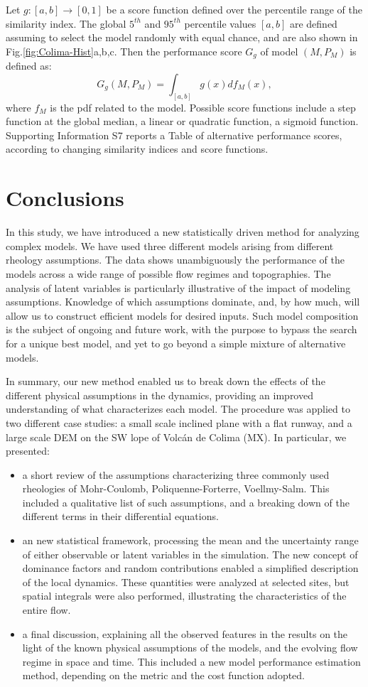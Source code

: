 \documentclass{article}
\begin{document}
Let $g:[a,b]\rightarrow[0,1]$ be a score function defined over the percentile range of the similarity index. The global $5^{th}$ and $95^{th}$ percentile values $[a,b]$ are defined assuming to select the model randomly with equal chance, and are also shown in Fig.\ref{fig:Colima-Hist}a,b,c. Then the performance score $G_g$ of model $\left(M, P_M\right)$ is defined as:
$$G_g\left(M, P_M\right)=\int_{[a,b]} g(x) df_M(x),$$
where $f_M$ is the pdf related to the model. Possible score functions include a step function at the global median, a linear or quadratic function, a sigmoid function. Supporting Information S7 reports a Table of alternative performance scores, according to changing similarity indices and score functions.
\section{Conclusions}
In this study, we have introduced a new statistically driven method for analyzing complex models. We have used three different models arising from different rheology assumptions. The data shows unambiguously the performance of the models across a wide range of possible flow regimes and topographies. The analysis of latent variables is particularly illustrative of the impact of modeling assumptions. Knowledge of which assumptions dominate, and, by how much, will allow us to construct efficient models for desired inputs. Such model composition is the subject of ongoing and future work, with the purpose to bypass the search for a unique best model, and yet to go beyond a simple mixture of alternative models.

In summary, our new method enabled us to break down the effects of the different physical assumptions in the dynamics, providing an improved understanding of what characterizes each model. The procedure was applied to two different case studies: a small scale inclined plane with a flat runway, and a large scale DEM on the SW lope of Volc\'{a}n de Colima (MX). In particular, we presented:
\begin{itemize}
  \item a short review of the assumptions characterizing three commonly used rheologies of Mohr-Coulomb, Poliquenne-Forterre, Voellmy-Salm. This included a qualitative list of such assumptions, and a breaking down of the different terms in their differential equations.
  \item an new statistical framework, processing the mean and the uncertainty range of either observable or latent variables in the simulation. The new concept of dominance factors and random contributions enabled a simplified description of the local dynamics. These quantities were analyzed at selected sites, but spatial integrals were also performed, illustrating the characteristics of the entire flow.
  \item a final discussion, explaining all the observed features in the results on the light of the known physical assumptions of the models, and the evolving flow regime in space and time. This included a new model performance estimation method, depending on the metric and the cost function adopted.
\end{itemize}
\end{document}
